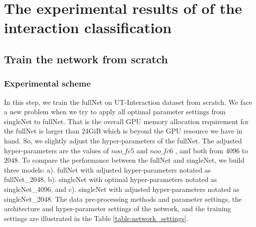 \section{The experimental results of of the interaction classification}
\subsection{Train the network from scratch}
\subsubsection*{Experimental scheme}
In this step, we train the fullNet on UT-Interaction dataset from scratch. We face a new problem when we try to apply all optimal parameter settings from singleNet to fullNet. That is the overall GPU memory allocation requirement for the fullNet is larger than 24GiB which is beyond the GPU resource we have in hand. So, we slightly adjust the hyper-parameters of the fullNet. The adjusted hyper-parameters are the values of \(noo\_fc5\) and \(noo\_fc6\) , and both from \(4096\) to \(2048\). To compare the performance between the fullNet and singleNet, we build three models: a). fullNet with adjusted hyper-parameters notated as fullNet\_2048, b). singleNet with optimal hyper-parameters notated as singleNet\_4096, and c). singleNet with adjusted hyper-parameters notated as singleNet\_2048.  The data pre-processing methods and parameter settings, the architecture and hyper-parameter settings of the network, and the training settings are illustrated in the Table \ref{table:network_settings}.
  
